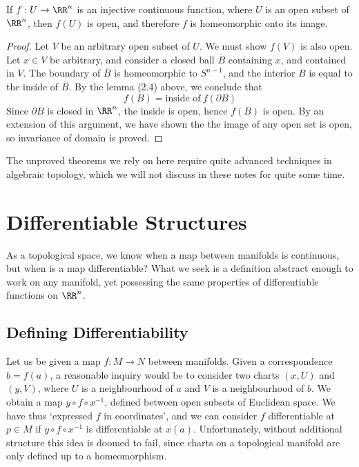 \begin{theorem}
    If $f:U \to \RR^n$ is an injective continuous function, where $U$ is an open subset of $\RR^n$, then $f(U)$ is open, and therefore $f$ is homeomorphic onto its image.
\end{theorem}
\begin{proof}
    Let $V$ be an arbitrary open subset of $U$. We must show $f(V)$ is also open. Let $x \in V$ be arbitrary, and consider a closed ball $\overline{B}$ containing $x$, and contained in $V$. The boundary of $\overline{B}$ is homeomorphic to $S^{n-1}$, and the interior $B$ is equal to the inside of $\overline{B}$. By the lemma (2.4) above, we conclude that
    \[ f(B) = \text{inside of}\ f(\partial B) \]
    Since $\partial B$ is closed in $\RR^n$, the inside is open, hence $f(B)$ is open. By an extension of this argument, we have shown the the image of any open set is open, so invariance of domain is proved.
\end{proof}

The unproved theorems we rely on here require quite advanced techniques in algebraic topology, which we will not discuss in these notes for quite some time.








\chapter{Differentiable Structures}

As a topological space, we know when a map between manifolds is continuous, but when is a map differentiable? What we seek is a definition abstract enough to work on any manifold, yet possessing the same properties of differentiable functions on $\RR^n$.

\section{Defining Differentiability}

Let us be given a map $f:M \to N$ between manifolds. Given a correspondence $b = f(a)$, a reasonable inquiry would be to consider two charts $(x,U)$ and $(y,V)$, where $U$ is a neighbourhood of $a$ and $V$ is a neighbourhood of $b$. We obtain a map $y \circ f \circ x^{-1}$, defined between open subsets of Euclidean space. We have thus `expressed $f$ in coordinates', and we can consider $f$ differentiable at $p \in M$ if $y \circ f \circ x^{-1}$ is differentiable at $x(a)$. Unfortunately, without additional structure this idea is doomed to fail, since charts on a topological manifold are only defined up to a homeomorphism.

